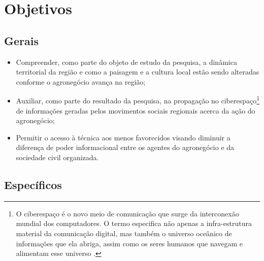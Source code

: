 \section{Objetivos}

\subsection{Gerais}

\begin{itemize}
 \item Compreender, como parte do objeto de estudo da pesquisa, a dinâmica territorial da região e como a paisagem e a cultura local estão sendo alteradas conforme o agronegócio avança na região;
 \item Auxiliar, como parte do resultado da pesquisa, na propagação no ciberespaço\footnote{O ciberespaço é o novo meio de comunicação que surge da interconexão mundial dos computadores. O termo especifica não apenas a infra-estrutura material da comunicação digital, mas também o universo oceânico de informações que ela abriga, assim como os seres humanos que navegam e alimentam esse universo \cite[p. 17]{levy}.} de informações geradas pelos movimentos sociais regionais acerca da ação do agronegócio;
 \item Permitir o acesso à técnica aos menos favorecidos visando diminuir a diferença de poder informacional entre os agentes do agronegócio e da sociedade civil organizada.
\end{itemize}

\subsection{Específicos}

